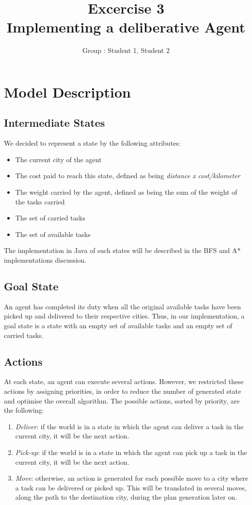 \documentclass[11pt]{article}
\title{\bf Excercise 3\\ Implementing a deliberative Agent}
\author{Group \textnumero : Student 1, Student 2}
\begin{document}
\maketitle

\section{Model Description}

\subsection{Intermediate States}
We decided to represent a state by the following attributes: 
\begin{itemize}
	\item The current city of the agent
	\item The cost paid to reach this state, defined as being \textit{distance x cost/kilometer}
	\item The weight carried by the agent, defined as being the sum of the weight of the tasks carried
	\item The set of carried tasks
	\item The set of available tasks
\end{itemize}

The implementation in Java of such states will be described in the BFS and A* implementations discussion.

\subsection{Goal State}
An agent has completed its duty when all the original available tasks have been picked up and delivered to their respective cities. Thus, in our implementation, a goal state is a state with an empty set of available tasks and an empty set of carried tasks. 

\subsection{Actions}
At each state, an agent can execute several actions. However, we restricted these actions by assigning priorities, in order to reduce the number of generated state and optimise the overall algorithm. The possible actions, sorted by priority, are the following:

\begin{enumerate}
	\item \textit{Deliver}: if the world is in a state in which the agent can deliver a task in the current city, it will be the next action.
	\item \textit{Pick-up}: if the world is in a state in which the agent can pick up a task in the current city, it will be the next action.
	\item \textit{Move}: otherwise, an action is generated for each possible move to a city where a task can be delivered or picked up. This will be translated in several moves, along the path to the destination city, during the plan generation later on.
\end{enumerate}
\end{document}
